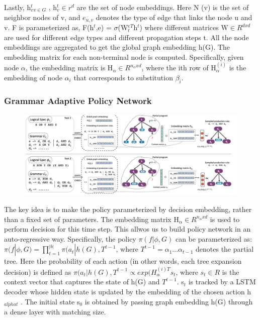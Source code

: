 \documentclass{article}
\begin{document}
Lastly, {h$^t_v$}$_{v\in G}$ , h$^t_v \in r^d$ are the set of node embeddings. Here N (v) is the set of neighbor nodes of v, and $e_{u,v}$ denotes the type of edge that links the node u and v. F is parameterized as, F(h$^t$,e) = $\sigma$(W$^{eT}_t$h$^t$) where different matrices W$\in R^{dxd}$ are used for different edge types and different propagation steps t. All the node embeddings are aggregated to get the global graph embedding h(G). The embedding matrix for each non-terminal node is computed. Specifically, given node $\alpha$, the embedding matrix is H$_\alpha \in R^{n_\alpha x d}$, where the ith row of H$_\alpha^{(i)}$ is the embedding of node $\alpha_i$ that corresponds to substitution $\beta_i$.
\subsubsection{Grammar Adaptive Policy Network}
\begin{figure}[ht]
\vskip 0.2in
\begin{center}
\centerline{\includegraphics[width=\columnwidth]{Images/Synthesis1-2.png}}
\label{icml-historical}
\end{center}
\vskip -0.2in
\end{figure}

The key idea is to make the policy parameterized by decision embedding, rather than a fixed set of parameters. The embedding matrix H$_\alpha \in R^{n_\alpha x d}$ is used to perform decision for this time step. This allwos us to build  policy network in an auto-regressive way. Specifically, the policy $\pi(f|\phi,G)$ can be parameterized as:$\pi(f|\phi,G) = \prod_{t=1}^{|b|} \pi(a_t|h(G),T^{t-1}$, where $T^{t-1}= \alpha_1 ... \alpha_{t-1}$ denotes the partial tree. Here the probability of each action (in other words, each tree expansion decision) is defined as $\pi(a_t|h(G),T^{t-1}\propto exp(H_\alpha^{(i)T}s_t$, where $s_t \in R$ is the context vector that captures the state of h(G) and $T^{t-1}$. s$_t$ is tracked by a LSTM decoder whose hidden state is updated by the embedding of the chosen action h$_{alpha t}$ . The initial state s$_0$ is obtained by passing graph embedding h(G) through a dense layer with matching size.
\end{document}
